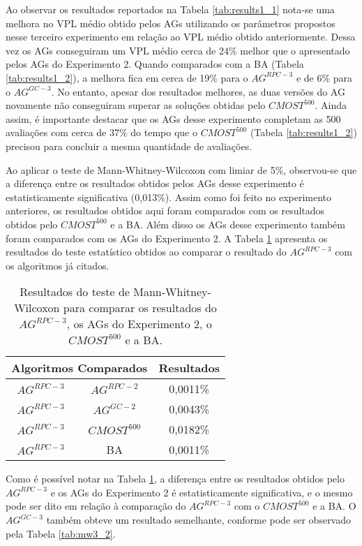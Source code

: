 Ao observar os resultados reportados na Tabela \ref{tab:results1_1} nota-se uma melhora no VPL médio obtido pelos AGs utilizando os parâmetros propostos nesse terceiro experimento em relação ao VPL médio obtido anteriormente. Dessa vez os AGs conseguiram um VPL médio cerca de 24\% melhor que o apresentado pelos AGs do Experimento 2. Quando comparados com a BA (Tabela \ref{tab:results1_2}), a melhora fica em cerca de 19\% para o $AG^{RPC-3}$ e de 6\% para o $AG^{GC-3}$. No entanto, apesar dos resultados melhores, as duas versões do AG novamente não conseguiram superar as soluções obtidas pelo $CMOST^{500}$. Ainda assim, é importante destacar que os AGs desse experimento completam as 500 avaliações com cerca de 37\% do tempo que o $CMOST^{500}$ (Tabela \ref{tab:results1_2}) precisou para concluir a mesma quantidade de avaliações.

Ao aplicar o teste de Mann-Whitney-Wilcoxon com limiar de 5\%, observou-se que a diferença entre os resultados obtidos pelos AGs desse experimento é estatisticamente significativa (0,013\%). Assim como foi feito no experimento anteriores, os resultados obtidos aqui foram comparados com os resultados obtidos pelo $CMOST^{500}$ e a BA. Além disso os AGs desse experimento também foram comparados com os AGs do Experimento 2. A Tabela \ref{tab:mw3_1} apresenta os resultados do teste estatístico obtidos ao comparar o resultado do $AG^{RPC-3}$ com os algoritmos já citados.

\begin{table}[H]
\centering
\caption{Resultados do teste de Mann-Whitney-Wilcoxon para comparar os resultados do $AG^{RPC-3}$, os AGs do Experimento 2, o $CMOST^{500}$ e a BA.}
\label{tab:mw3_1}
\begin{tabular}{|c|c|c|}
\hline
\multicolumn{2}{|c|}{Algoritmos Comparados} & Resultados \\ \hline
$AG^{RPC-3}$ & $AG^{RPC-2}$ & 0,0011\% \\ \hline
$AG^{RPC-3}$ & $AG^{GC-2}$ & 0,0043\% \\ \hline
$AG^{RPC-3}$ & $CMOST^{500}$ & 0,0182\% \\ \hline
$AG^{RPC-3}$ & BA & 0,0011\% \\ \hline

\end{tabular}
\end{table}

Como é possível notar na Tabela \ref{tab:mw3_1}, a diferença entre os resultados obtidos pelo $AG^{RPC-3}$ e os AGs do Experimento 2 é estatisticamente significativa, e o mesmo pode ser dito em relação à comparação do $AG^{RPC-3}$ com o $CMOST^{500}$ e a BA. O $AG^{GC-3}$ também obteve um resultado semelhante, conforme pode ser observado pela Tabela \ref{tab:mw3_2}.

